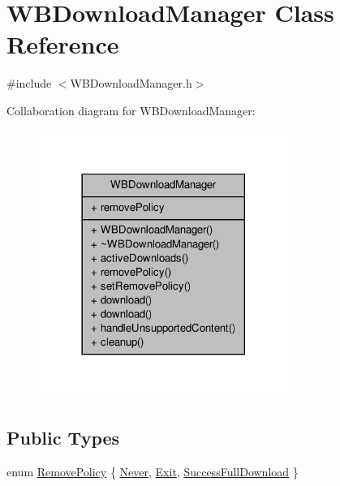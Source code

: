 \hypertarget{class_w_b_download_manager}{\section{W\-B\-Download\-Manager Class Reference}
\label{d3/dda/class_w_b_download_manager}
}


{\ttfamily \#include $<$W\-B\-Download\-Manager.\-h$>$}



Collaboration diagram for W\-B\-Download\-Manager\-:
\nopagebreak
\begin{figure}[H]
\begin{center}
\leavevmode
\includegraphics[width=230pt]{d4/dab/class_w_b_download_manager__coll__graph}
\end{center}
\end{figure}
\subsection*{Public Types}
\begin{DoxyCompactItemize}
\item 
enum \hyperlink{class_w_b_download_manager_ab10eb3722996f2a36c2778da4591f686}{Remove\-Policy} \{ \hyperlink{class_w_b_download_manager_ab10eb3722996f2a36c2778da4591f686a7e4cdbd8d8eab9036eb411f4130c9d21}{Never}, 
\hyperlink{class_w_b_download_manager_ab10eb3722996f2a36c2778da4591f686ac4efc71587b44216e99083404e4e08bf}{Exit}, 
\hyperlink{class_w_b_download_manager_ab10eb3722996f2a36c2778da4591f686a927c5222a5aa61c7391e4db53da5a1c4}{Success\-Full\-Download}
 \}
\end{DoxyCompactItemize}
